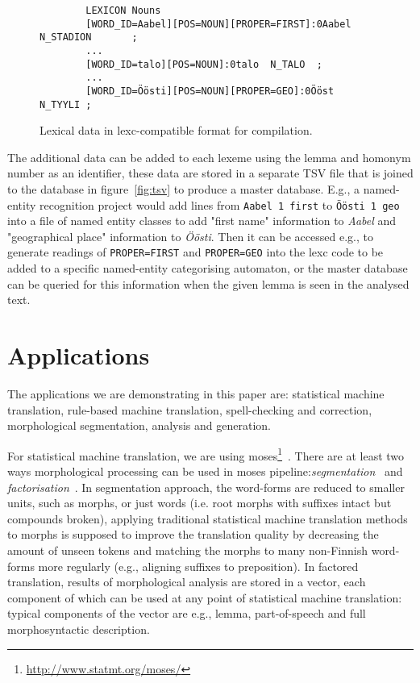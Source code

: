\documentclass[11pt]{article}
\begin{document}
\begin{figure*}[ht]
    \centering
    \begin{verbatim}
        LEXICON Nouns
        [WORD_ID=Aabel][POS=NOUN][PROPER=FIRST]:0Aabel N_STADION       ;
        ...
        [WORD_ID=talo][POS=NOUN]:0talo  N_TALO  ;
        ...
        [WORD_ID=Öösti][POS=NOUN][PROPER=GEO]:0Ööst  N_TYYLI ;
    \end{verbatim}
    \caption{Lexical data in lexc-compatible format for compilation.
    \label{fig:lexc}}
\end{figure*}

The additional data can be added to each lexeme using
the lemma and homonym number as an identifier, these
data are stored in a separate TSV file that is joined
to the database in figure~\ref{fig:tsv} to produce a
master database. E.g., a named-entity recognition
project would add lines from \texttt{Aabel 1 first}
to \texttt{Öösti 1 geo} into a file of named entity
classes to add "first name" information to
\emph{Aabel} and "geographical place" information to
\emph{Öösti}. Then it can be accessed e.g., to
generate readings of \texttt{PROPER=FIRST} and
\texttt{PROPER=GEO} into the lexc code to be added to
a specific named-entity categorising automaton, or
the master database can be queried for this
information when the given lemma is seen in the
analysed text.


\section{Applications}

The applications we are demonstrating in this paper are:
statistical machine translation, rule-based machine translation,
spell-checking and correction, morphological segmentation, analysis and
generation.

For statistical machine translation, we are using
moses\footnote{\url{http://www.statmt.org/moses/}}~\cite{moses}. There are
at least two ways morphological processing can be used in moses
pipeline:\emph{segmentation}~\cite{dyer2008generalizing} and
\emph{factorisation}~\cite{koehn2007factored}.  In segmentation approach,
the word-forms are reduced to smaller units, such as morphs, or just words
(i.e.  root morphs with suffixes intact but compounds broken), applying
traditional statistical machine translation methods to morphs is supposed to
improve the translation quality by decreasing the amount of unseen tokens
and matching the morphs to many non-Finnish word-forms more regularly (e.g.,
aligning suffixes to preposition). In factored translation, results of
morphological analysis are stored in a vector, each component of which can
be used at any point of statistical machine translation: typical components
of the vector are e.g., lemma, part-of-speech and full morphosyntactic
description.
\end{document}
